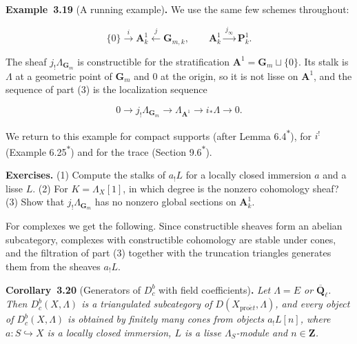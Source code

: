 \documentclass[11pt]{article}
\newenvironment{bpstatement}[2]{\par\addvspace{0.6\baselineskip}\noindent\textbf{#1}#2\textbf{.}\enspace\ignorespaces}
  {\par\addvspace{0.4\baselineskip}}
\newenvironment{bpstatementit}[2]{\begin{bpstatement}{#1}{#2}\itshape\ignorespaces}{\end{bpstatement}}
\newcommand{\bpout}[1]{#1\textsuperscript{\hyperlink{bp-outside}{\ensuremath{\ast}}}}
\providecommand{\Dbc}{}\renewcommand{\Dbc}{D^b_c}
\begin{document}
\label{bp59}%
\begin{bpstatement}{Example~3.19}{ (A running example)}
We use the same few schemes throughout:

\[
\{0\}\xrightarrow{\ i\ }\mathbf A^1_k\xleftarrow{\ j\ }\mathbf G_{m,k},
\qquad \mathbf A^1_k\xrightarrow{\ j_\infty\ }\mathbf P^1_k .
\]

The sheaf \(j_!\Lambda_{\mathbf G_m}\) is constructible for the stratification \(\mathbf A^1=\mathbf G_m\sqcup\{0\}\). Its stalk is \(\Lambda\) at a geometric point of \(\mathbf G_m\) and \(0\) at the origin, so it is not lisse on \(\mathbf A^1\), and the sequence of part (3) is the localization sequence

\[
0\to j_!\Lambda_{\mathbf G_m}\to\Lambda_{\mathbf A^1}\to i_*\Lambda\to0 .
\]

We return to this example for compact supports (after Lemma \bpout{6.4}), for \(i^!\) (Example \bpout{6.25}) and for the trace (Section \bpout{9.6}).
\end{bpstatement}

\label{bp60}%
\textbf{Exercises.} (1) Compute the stalks of \(a_!L\) for a locally closed immersion \(a\) and a lisse \(L\). (2) For \(K=\Lambda_X[1]\), in which degree is the nonzero cohomology sheaf? (3) Show that \(j_!\Lambda_{\mathbf G_m}\) has no nonzero global sections on \(\mathbf A^1_k\).

For complexes we get the following. Since constructible sheaves form an abelian subcategory, complexes with constructible cohomology are stable under cones, and the filtration of part (3) together with the truncation triangles generates them from the sheaves \(a_!L\).

\label{bp61}%
\begin{bpstatementit}{Corollary~3.20}{ (Generators of $D^b_c$ with field coefficients)}
Let \(\Lambda=E\) or \(\overline{\mathbf Q}_\ell\). Then \(\Dbc(X,\Lambda)\) is a triangulated subcategory of \(D(X_{\mathrm{pro}\acute{e}t},\Lambda)\), and every object of \(\Dbc(X,\Lambda)\) is obtained by finitely many cones from objects \(a_!L[n]\), where \(a:S\hookrightarrow X\) is a locally closed immersion, \(L\) is a lisse \(\Lambda_S\)-module and \(n\in\mathbf Z\).
\end{bpstatementit}
\end{document}
